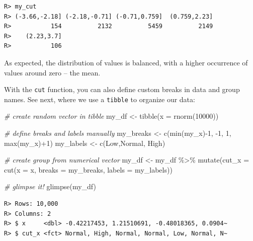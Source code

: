 \documentclass[
  12pt,
]{book}
\newenvironment{Shaded}{\begin{snugshade}}{\end{snugshade}}
\newcommand{\AttributeTok}[1]{\textcolor[rgb]{0.61,0.61,0.61}{#1}}
\newcommand{\CommentTok}[1]{\textcolor[rgb]{0.37,0.37,0.37}{\textit{#1}}}
\newcommand{\DecValTok}[1]{\textcolor[rgb]{0.06,0.06,0.06}{#1}}
\newcommand{\FunctionTok}[1]{\textcolor[rgb]{0,0,0}{#1}}
\newcommand{\NormalTok}[1]{#1}
\newcommand{\OtherTok}[1]{\textcolor[rgb]{0.37,0.37,0.37}{#1}}
\newcommand{\SpecialCharTok}[1]{\textcolor[rgb]{0,0,0}{#1}}
\newcommand{\StringTok}[1]{\textcolor[rgb]{0.5,0.5,0.5}{#1}}
\begin{document}
\begin{verbatim}
R> my_cut
R> (-3.66,-2.18] (-2.18,-0.71] (-0.71,0.759]  (0.759,2.23] 
R>           154          2132          5459          2149 
R>    (2.23,3.7] 
R>           106
\end{verbatim}

As expected, the distribution of values is balanced, with a higher occurrence of values around zero -- the mean.

With the \texttt{cut} function, you can also define custom breaks in data and group names. See next, where we use a \texttt{tibble} to organize our data:

\begin{Shaded}
\begin{Highlighting}[]
\CommentTok{\# create random vector in tibble}
\NormalTok{my\_df }\OtherTok{\textless{}{-}} \FunctionTok{tibble}\NormalTok{(}\AttributeTok{x =} \FunctionTok{rnorm}\NormalTok{(}\DecValTok{10000}\NormalTok{))}

\CommentTok{\# define breaks and labels manually}
\NormalTok{my\_breaks }\OtherTok{\textless{}{-}} \FunctionTok{c}\NormalTok{(}\FunctionTok{min}\NormalTok{(my\_x)}\SpecialCharTok{{-}}\DecValTok{1}\NormalTok{, }\SpecialCharTok{{-}}\DecValTok{1}\NormalTok{, }\DecValTok{1}\NormalTok{, }\FunctionTok{max}\NormalTok{(my\_x)}\SpecialCharTok{+}\DecValTok{1}\NormalTok{)}
\NormalTok{my\_labels }\OtherTok{\textless{}{-}} \FunctionTok{c}\NormalTok{(}\StringTok{\textquotesingle{}Low\textquotesingle{}}\NormalTok{,}\StringTok{\textquotesingle{}Normal\textquotesingle{}}\NormalTok{, }\StringTok{\textquotesingle{}High\textquotesingle{}}\NormalTok{)}

\CommentTok{\# create group from numerical vector}
\NormalTok{my\_df }\OtherTok{\textless{}{-}}\NormalTok{ my\_df }\SpecialCharTok{\%\textgreater{}\%}
  \FunctionTok{mutate}\NormalTok{(}\AttributeTok{cut\_x =} \FunctionTok{cut}\NormalTok{(}\AttributeTok{x =}\NormalTok{ x, }
                     \AttributeTok{breaks =}\NormalTok{ my\_breaks, }
                     \AttributeTok{labels =}\NormalTok{ my\_labels))}

\CommentTok{\# glimpse it!}
\FunctionTok{glimpse}\NormalTok{(my\_df)}
\end{Highlighting}
\end{Shaded}

\begin{verbatim}
R> Rows: 10,000
R> Columns: 2
R> $ x     <dbl> -0.42217453, 1.21510691, -0.48018365, 0.0904~
R> $ cut_x <fct> Normal, High, Normal, Normal, Low, Normal, N~
\end{verbatim}
\end{document}
